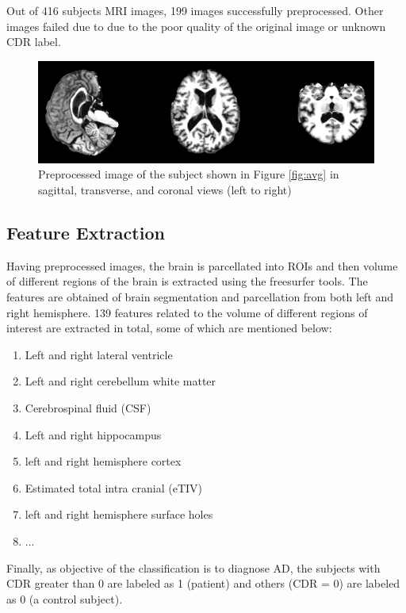 Out of 416 subjects MRI images, 199 images successfully preprocessed. Other images failed due to due to the poor quality of the original image or unknown CDR label.

\begin{figure}
	\centering
	\includegraphics[width=\columnwidth]{images/preprocessed.png}
	\caption{Preprocessed image of the subject shown in Figure \ref{fig:avg} in sagittal, transverse, and coronal views (left to right)}
	\label{fig:pre}
\end{figure} 

\subsection{Feature Extraction}
Having preprocessed images, the brain is parcellated into ROIs and then volume of different regions of the brain is extracted using the freesurfer tools. The features are obtained of brain segmentation and parcellation from both left and right hemisphere. 139 features related to the volume of different regions of interest are extracted in total, some of which are mentioned below:

\begin{enumerate}
	\item Left and right lateral ventricle
	\item Left and right cerebellum white matter
	\item Cerebrospinal fluid (CSF)
	\item Left and right hippocampus
	\item left and right hemisphere cortex
	\item Estimated total intra cranial (eTIV)
	\item left and right hemisphere surface holes
	\item ...
\end{enumerate}

Finally, as objective of the classification is to diagnose AD, the subjects with CDR greater than 0 are labeled as 1 (patient) and others (CDR = 0) are labeled as 0 (a control subject).

